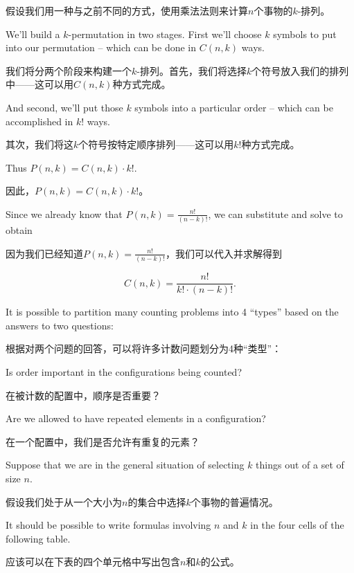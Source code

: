 假设我们用一种与之前不同的方式，使用乘法法则来计算$n$个事物的$k$-排列。

We'll
build a $k$-permutation in two stages.  First we'll choose $k$ symbols
to put into our permutation -- which can be done in $C(n,k)$ ways.

我们将分两个阶段来构建一个$k$-排列。首先，我们将选择$k$个符号放入我们的排列中——这可以用$C(n,k)$种方式完成。

And
second, we'll put those $k$ symbols into a particular order -- which
can be accomplished in $k!$ ways.

其次，我们将这$k$个符号按特定顺序排列——这可以用$k!$种方式完成。

Thus $P(n,k) = C(n,k) \cdot k!$. 

因此，$P(n,k) = C(n,k) \cdot k!$。

Since we already know that $P(n,k) = \frac{n!}{(n-k)!}$, we can 
substitute and solve to obtain 

因为我们已经知道$P(n,k) = \frac{n!}{(n-k)!}$，我们可以代入并求解得到

\[ C(n,k) = \frac{n!}{k! \cdot (n-k)!}. \]

It is possible to partition many counting problems into 4 ``types''
based on the answers to two questions:

根据对两个问题的回答，可以将许多计数问题划分为4种“类型”：

Is order important in the configurations being counted?

在被计数的配置中，顺序是否重要？

Are we allowed to have repeated elements in a configuration?

在一个配置中，我们是否允许有重复的元素？

Suppose that we are in the general situation of selecting $k$ things
out of a set of size $n$.

假设我们处于从一个大小为$n$的集合中选择$k$个事物的普遍情况。

It should be possible to write formulas
involving $n$ and $k$ in the four cells of the following table.

应该可以在下表的四个单元格中写出包含$n$和$k$的公式。

